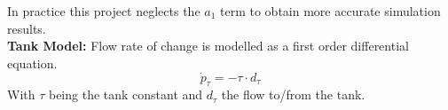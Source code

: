 In practice this project neglects the $ a_1 $ term to obtain more accurate simulation results.\\  
\textbf{Tank Model:} Flow rate of change is modelled as a first order differential equation.
\begin{equation} \label{eq:dpTank}
	\dot{p}_{\tau}=-\tau \cdot d_{\tau} 
\end{equation} 
With $ \tau $ being the tank constant and $ d_\tau $ the flow to/from the tank.